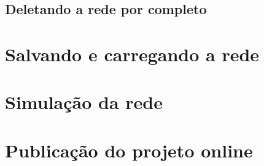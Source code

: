 \documentclass[
	12pt,				%
	openright,			%
	oneside,			%
	a4paper,			%
	english,			%
	brazil				%
	]{abntex2}
\begin{document}
\subsection*{Deletando a rede por completo}

\section{Salvando e carregando a rede}

\section{Simulação da rede}

\section{Publicação do projeto online}






\end{document}
